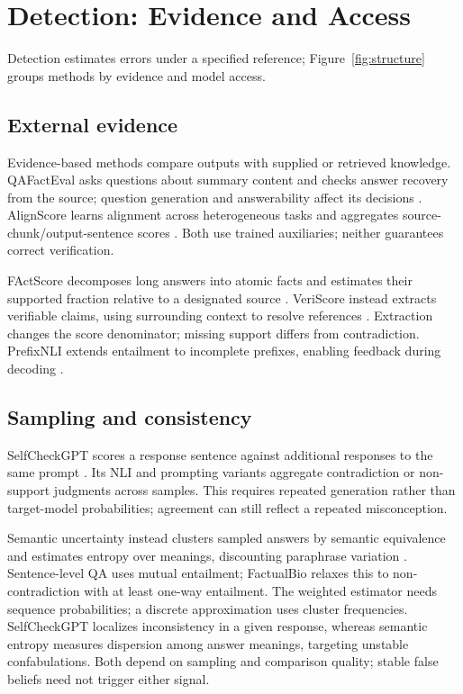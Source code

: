 \section{Detection: Evidence and Access}\label{sec:detection}
Detection estimates errors under a specified reference; Figure~\ref{fig:structure} groups methods by evidence and model access.

\subsection{External evidence}
Evidence-based methods compare outputs with supplied or retrieved knowledge. QAFactEval asks questions about summary content and checks answer recovery from the source; question generation and answerability affect its decisions \citep{fabbri-etal-2022-qafacteval}. AlignScore learns alignment across heterogeneous tasks and aggregates source-chunk/output-sentence scores \citep{zha-etal-2023-alignscore}. Both use trained auxiliaries; neither guarantees correct verification.

FActScore decomposes long answers into atomic facts and estimates their supported fraction relative to a designated source \citep{min-etal-2023-factscore}. VeriScore instead extracts verifiable claims, using surrounding context to resolve references \citep{song-etal-2024-veriscore}. Extraction changes the score denominator; missing support differs from contradiction. PrefixNLI extends entailment to incomplete prefixes, enabling feedback during decoding \citep{harary-etal-2026-prefixnli}.

\subsection{Sampling and consistency}
SelfCheckGPT scores a response sentence against additional responses to the same prompt \citep{manakul-etal-2023-selfcheckgpt}. Its NLI and prompting variants aggregate contradiction or non-support judgments across samples. This requires repeated generation rather than target-model probabilities; agreement can still reflect a repeated misconception.

Semantic uncertainty instead clusters sampled answers by semantic equivalence and estimates entropy over meanings, discounting paraphrase variation \citep{extsemanticuncertainty2023,extsemanticentropy2024}. Sentence-level QA uses mutual entailment; FactualBio relaxes this to non-contradiction with at least one-way entailment. The weighted estimator needs sequence probabilities; a discrete approximation uses cluster frequencies. SelfCheckGPT localizes inconsistency in a given response, whereas semantic entropy measures dispersion among answer meanings, targeting unstable confabulations. Both depend on sampling and comparison quality; stable false beliefs need not trigger either signal.

